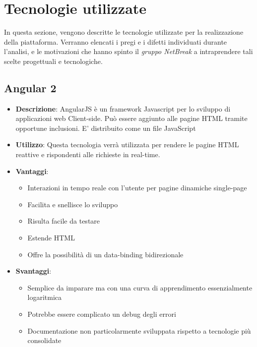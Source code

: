 \newpage
\section{Tecnologie utilizzate}
In questa sezione, vengono descritte le tecnologie utilizzate per la realizzazione della piattaforma. Verranno elencati i pregi e i difetti individuati durante l'analisi, e le motivazioni che hanno spinto il \textit{gruppo NetBreak} a intraprendere tali scelte progettuali e tecnologiche.

\subsection{Angular 2}
\begin{itemize}
	\item \textbf{Descrizione}: AngularJS è un framework Javascript per lo sviluppo di applicazioni web Client-side. Può essere aggiunto alle pagine HTML tramite opportune inclusioni. E' distribuito come un file JavaScript
	\item \textbf{Utilizzo}: Questa tecnologia verrà utilizzata per rendere le pagine HTML reattive e rispondenti alle richieste in real-time.
	\item \textbf{Vantaggi}: 
	\begin{itemize}
		\item Interazioni in tempo reale con l'utente per pagine dinamiche single-page
		\item Facilita e snellisce lo sviluppo
		\item Risulta facile da testare
		\item Estende HTML
		\item Offre la possibilità di un data-binding bidirezionale
	\end{itemize}
	\item \textbf{Svantaggi}:
	\begin{itemize}
		\item Semplice da imparare ma con una curva di apprendimento essenzialmente logaritmica
		\item Potrebbe essere complicato un debug degli errori
		\item Documentazione non particolarmente sviluppata rispetto a tecnologie più consolidate
	\end{itemize}
\end{itemize}

